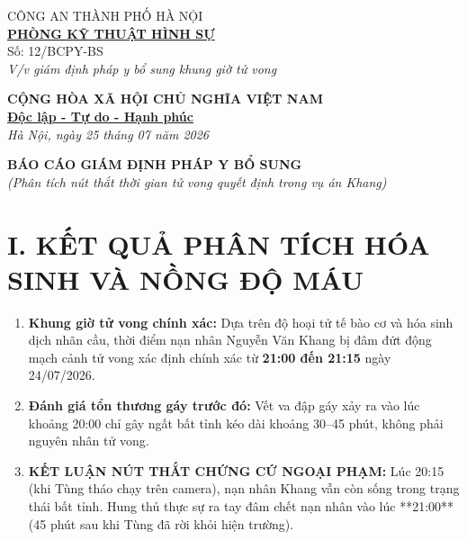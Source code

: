 \documentclass[12pt,a4paper]{article}
\begin{document}
\noindent
\begin{minipage}[t]{0.45\textwidth}
    \begin{center}
        \small
        CÔNG AN THÀNH PHỐ HÀ NỘI\\
        \textbf{\underline{PHÒNG KỸ THUẬT HÌNH SỰ}}\\[0.1cm]
        Số: 12/BCPY-BS\\
        \textit{V/v giám định pháp y bổ sung khung giờ tử vong}
    \end{center}
\end{minipage}
\hfill
\begin{minipage}[t]{0.52\textwidth}
    \begin{center}
        \small
        \textbf{CỘNG HÒA XÃ HỘI CHỦ NGHĨA VIỆT NAM}\\
        \textbf{\underline{Độc lập - Tự do - Hạnh phúc}}\\[0.1cm]
        \textit{Hà Nội, ngày 25 tháng 07 năm 2026}
    \end{center}
\end{minipage}

\vspace{0.6cm}

\begin{center}
    \textbf{\large BÁO CÁO GIÁM ĐỊNH PHÁP Y BỔ SUNG}\\
    \textit{(Phân tích nút thắt thời gian tử vong quyết định trong vụ án Khang)}
\end{center}

\vspace{0.3cm}

\section*{I. KẾT QUẢ PHÂN TÍCH HÓA SINH VÀ NỒNG ĐỘ MÁU}
\begin{enumerate}[label=\arabic*., leftmargin=1.5cm]
    \item \textbf{Khung giờ tử vong chính xác:} Dựa trên độ hoại tử tế bào cơ và hóa sinh dịch nhãn cầu, thời điểm nạn nhân Nguyễn Văn Khang bị đâm đứt động mạch cảnh tử vong xác định chính xác từ \textbf{21:00 đến 21:15} ngày 24/07/2026.
    \item \textbf{Đánh giá tổn thương gáy trước đó:} Vết va đập gáy xảy ra vào lúc khoảng 20:00 chỉ gây ngất bất tỉnh kéo dài khoảng 30–45 phút, không phải nguyên nhân tử vong.
    \item \textbf{KẾT LUẬN NÚT THẮT CHỨNG CỨ NGOẠI PHẠM:} Lúc 20:15 (khi Tùng tháo chạy trên camera), nạn nhân Khang vẫn còn sống trong trạng thái bất tỉnh. Hung thủ thực sự ra tay đâm chết nạn nhân vào lúc **21:00** (45 phút sau khi Tùng đã rời khỏi hiện trường).
\end{enumerate}
\end{document}
